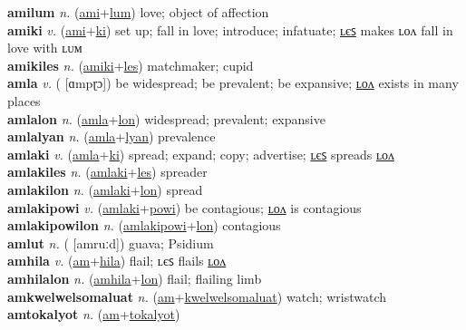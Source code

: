 \textbf{amilum} \textit{n.} (\hyperref[ami]{ami}+\hyperref[lum]{lum})
love; object of affection \label{amilum} \\
\textbf{amiki} \textit{v.} (\hyperref[ami]{ami}+\hyperref[ki]{ki})
set up; fall in love; introduce; infatuate; \hyperref[amikiles]{ʟєꜱ} makes ʟᴏᴧ fall in love with ʟᴜᴍ \label{amiki} \\
\textbf{amikiles} \textit{n.} (\hyperref[amiki]{amiki}+\hyperref[les]{les})
matchmaker; cupid \label{amikiles} \\
\textbf{amla} \textit{v.} ( [ɑmpɽɔ])
be widespread; be prevalent; be expansive; \hyperref[amlalon]{ʟᴏᴧ} exists in many places \label{amla} \\
\textbf{amlalon} \textit{n.} (\hyperref[amla]{amla}+\hyperref[lon]{lon})
widespread; prevalent; expansive \label{amlalon} \\
\textbf{amlalyan} \textit{n.} (\hyperref[amla]{amla}+\hyperref[lyan]{lyan})
prevalence \label{amlalyan} \\
\textbf{amlaki} \textit{v.} (\hyperref[amla]{amla}+\hyperref[ki]{ki})
spread; expand; copy; advertise; \hyperref[amlakiles]{ʟєꜱ} spreads \hyperref[amlakilon]{ʟᴏᴧ} \label{amlaki} \\
\textbf{amlakiles} \textit{n.} (\hyperref[amlaki]{amlaki}+\hyperref[les]{les})
spreader \label{amlakiles} \\
\textbf{amlakilon} \textit{n.} (\hyperref[amlaki]{amlaki}+\hyperref[lon]{lon})
spread \label{amlakilon} \\
\textbf{amlakipowi} \textit{v.} (\hyperref[amlaki]{amlaki}+\hyperref[powi]{powi})
be contagious; \hyperref[amlakipowilon]{ʟᴏᴧ} is contagious \label{amlakipowi} \\
\textbf{amlakipowilon} \textit{n.} (\hyperref[amlakipowi]{amlakipowi}+\hyperref[lon]{lon})
contagious \label{amlakipowilon} \\
\textbf{amlut} \textit{n.} ( [amruːd])
guava; Psidium \label{amlut} \\
\textbf{amhila} \textit{v.} (\hyperref[am]{am}+\hyperref[hila]{hila})
flail; ʟєꜱ flails \hyperref[amhilalon]{ʟᴏᴧ} \label{amhila} \\
\textbf{amhilalon} \textit{n.} (\hyperref[amhila]{amhila}+\hyperref[lon]{lon})
flail; flailing limb \label{amhilalon} \\
\textbf{amkwelwelsomaluat} \textit{n.} (\hyperref[am]{am}+\hyperref[kwelwelsomaluat]{kwelwelsomaluat})
watch; wristwatch \label{amkwelwelsomaluat} \\
\textbf{amtokalyot} \textit{n.} (\hyperref[am]{am}+\hyperref[tokalyot]{tokalyot})
